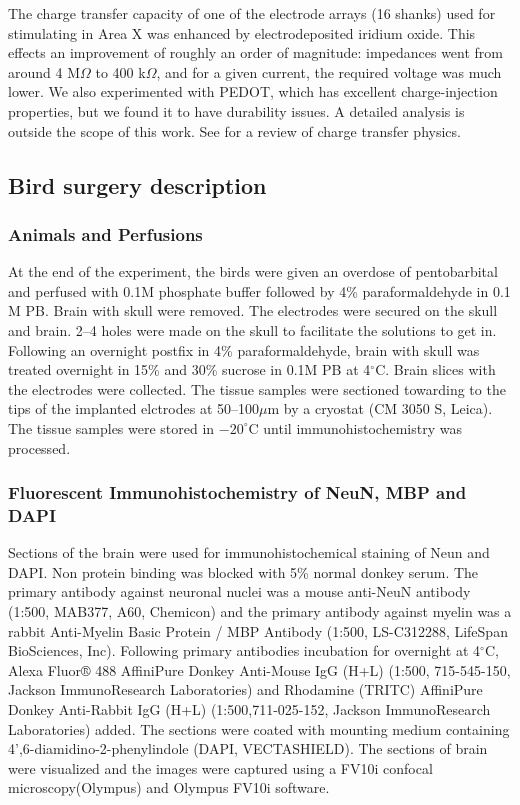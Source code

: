 \documentclass[10pt,letterpaper]{article}
\let\oldmarginpar\marginpar
\renewcommand{\marginpar}[1]{\oldmarginpar{\linespread{1}\scriptsize{#1}}}
\begin{document}
The charge transfer capacity of one of the electrode arrays (16
shanks) used for stimulating in Area X was enhanced by
electrodeposited iridium oxide. This effects an improvement of roughly
an order of magnitude: impedances went from around 4 M$\Omega$ to 400
k$\Omega$, and for a given current, the required voltage was much
lower.\marginpar{FIXME} We also experimented with PEDOT, which has
excellent charge-injection properties, but we found it to have
durability issues. A detailed analysis is outside the scope of this
work.\marginpar{All I know about this is hearsay.}  See
\cite{Cogan2008electrodes} for a review of charge transfer physics.

\subsection{Bird surgery description}

\subsubsection{Animals and Perfusions}

At the end of the experiment, the birds were given an overdose of
pentobarbital and perfused with 0.1M phosphate buffer followed by 4\%
paraformaldehyde in 0.1 M PB.  Brain with skull were removed. The
electrodes were secured on the skull and brain. 2--4 holes were made
on the skull to facilitate the solutions to get in. Following an
overnight postfix in 4\% paraformaldehyde, brain with skull was
treated overnight in 15\% and 30\% sucrose\marginpar{Which?} in 0.1M PB at 4$^\circ$C.
Brain slices with the electrodes were collected. The tissue samples
were sectioned towarding to the tips of the implanted elctrodes at
50--100$\mu$m by a cryostat (CM 3050 S, Leica). The tissue samples
were stored in $-20^\circ$C until immunohistochemistry was processed.

\subsubsection{Fluorescent Immunohistochemistry of NeuN, MBP and DAPI}

Sections of the brain were used for immunohistochemical staining of
Neun and DAPI. Non protein binding was blocked with 5\% normal donkey
serum. The primary antibody against neuronal nuclei was a mouse
anti-NeuN antibody (1:500, MAB377, A60, Chemicon) and the primary
antibody against myelin was a rabbit Anti-Myelin Basic Protein / MBP
Antibody (1:500, LS-C312288, LifeSpan BioSciences, Inc). Following
primary antibodies incubation for overnight at 4$^\circ$C, Alexa
Fluor® 488 AffiniPure Donkey Anti-Mouse IgG (H+L) (1:500, 715-545-150,
Jackson ImmunoResearch Laboratories) and Rhodamine (TRITC) AffiniPure
Donkey Anti-Rabbit IgG (H+L) (1:500,711-025-152, Jackson
ImmunoResearch Laboratories) added. The sections were coated with
mounting medium containing 4',6-diamidino-2-phenylindole (DAPI,
VECTASHIELD).  The sections of brain were visualized and the images
were captured using a FV10i confocal microscopy(Olympus) and Olympus
FV10i software.
\end{document}
